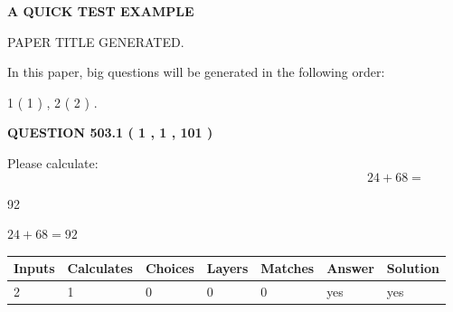 \documentclass[12pt]{article}
\begin{document}
   
\vspace{0.2in}
   
   
   
   
   
   
   
   
 \vspace{0.2in}
{\LARGE {\textbf{ A QUICK TEST EXAMPLE}}}
   
   
 PAPER TITLE GENERATED.
   
   
   
\vspace{0.2in}
   
In this paper, big questions will be generated in the following order: 
   
   
   1 ( 1 )
 ,
   2 ( 2 )
 .
  
\vspace{0.2in}
  
{\textbf{\Large{QUESTION
503.1 
 ( 1 , 1 , 101 )
}}}
  
  
 
Please calculate:
\begin{equation}
24 +  %
68 = \nonumber
\end{equation}
 
 
 
\noindent{}
 
 

92
 
 
\noindent{}
 
 

 
 
 
\noindent{}
 
 

$ %
24 +  %
68=   %
92$
 
 
\noindent{}
 
 

 
   
   
   
   
\noindent\begin{tabular}{|l|l|l|l|l|l|l|}
 \hline
Inputs & Calculates & Choices & Layers & Matches & Answer & Solution \\ \hline
 2  & 
 1  & 
 0
  & 
 0  & 
 0  & 
  yes & 
  yes 
  \\ \hline
 \end{tabular}
   
\end{document}
